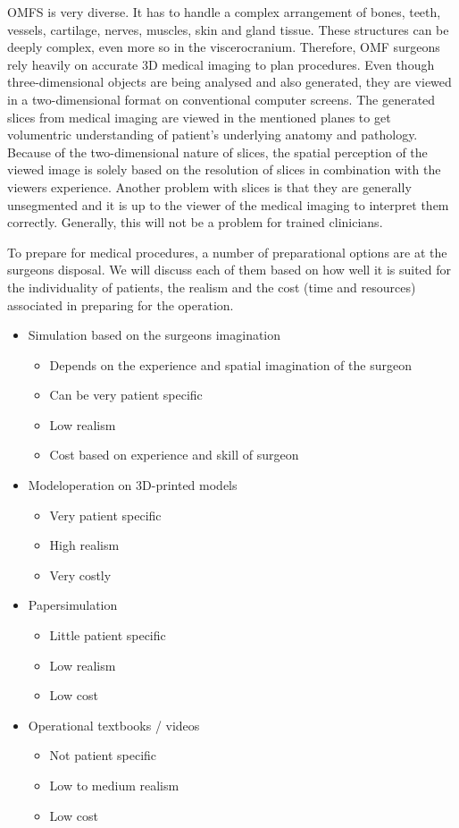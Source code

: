 OMFS is very diverse. It has to handle a complex arrangement of bones, teeth, vessels, cartilage, nerves, muscles, skin and gland tissue.
These structures can be deeply complex, even more so in the viscerocranium.
Therefore, OMF surgeons rely heavily on accurate 3D medical imaging to plan procedures.
Even though three-dimensional objects are being analysed and also generated, they are viewed in a two-dimensional format on conventional computer screens.
The generated slices from medical imaging are viewed in the mentioned planes to get volumentric understanding of patient's underlying anatomy and pathology.
Because of the two-dimensional nature of slices, the spatial perception of the viewed image is solely based on the resolution of slices in combination with the viewers experience.
Another problem with slices is that they are generally unsegmented and it is up to the viewer of the medical imaging to interpret them correctly.
Generally, this will not be a problem for trained clinicians.

To prepare for medical procedures, a number of preparational options are at the surgeons disposal.
We will discuss each of them based on how well it is suited for the individuality of patients, the realism and the cost (time and resources) associated in preparing for the operation.

\begin{itemize}
    \item Simulation based on the surgeons imagination
    \begin{itemize}
        \item Depends on the experience and spatial imagination of the surgeon
        \item Can be very patient specific
        \item Low realism
        \item Cost based on experience and skill of surgeon
    \end{itemize}
    \item Modeloperation on 3D-printed models
    \begin{itemize}
        \item Very patient specific
        \item High realism
        \item Very costly
    \end{itemize}
    \item Papersimulation
    \begin{itemize}
        \item Little patient specific
        \item Low realism
        \item Low cost
    \end{itemize}
    \item Operational textbooks / videos
    \begin{itemize}
        \item Not patient specific
        \item Low to medium realism
        \item Low cost
    \end{itemize}
\end{itemize}

